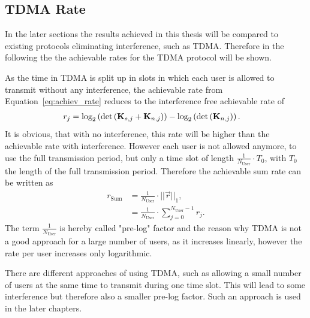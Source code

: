 \subsection{TDMA Rate}
\label{sec:tdma_rate}
In the later sections the results achieved in this thesis will be compared to existing protocols eliminating interference, such as TDMA.
Therefore in the following the the achievable rates for the TDMA protocol will be shown.

As the time in TDMA is split up in slots in which each user is allowed to transmit without any interference, the achievable rate from Equation~\eqref{eq:achiev_rate} reduces to the interference free achievable rate of 
\begin{align}
\label{eq:tdma_achiev_rate}
r_j  &=\text{log}_2\left(\text{det}\left(\mathbf{K}_{s,j}+\mathbf{K}_{n,j}\right)\right) -
	     	\text{log}_2\left(\text{det}\left(\mathbf{K}_{n,j}\right)\right).
\end{align}
It is obvious, that with no interference, this rate will be higher than the achievable rate with interference.
However each user is not allowed anymore, to use the full transmission period, but only a time slot of length $\frac{1}{N_\text{User}}\cdot T_0$, with $T_0$ the length of the full transmission period.
Therefore the achievable sum rate can be written as
\begin{align}
\label{eq:tdma_achiev_sum_rate}
\nonumber
r_{\text{Sum}} &= \frac{1}{N_\text{User}}\cdot||\vec{r}||_1,\\
&= \frac{1}{N_\text{User}}\cdot \sum_{j=0}^{N_\text{User}-1} r_j.
\end{align}
The term $\frac{1}{N_\text{User}}$ is hereby called "pre-log" factor and the reason why TDMA is not a good approach for a large number of users, as it increases linearly, however the rate per user increases only logarithmic.

There are different approaches of using TDMA, such as allowing a small number of users at the same time to transmit during one time slot.
This will lead to some interference but therefore also a smaller pre-log factor.
Such an approach is used in the later chapters.





